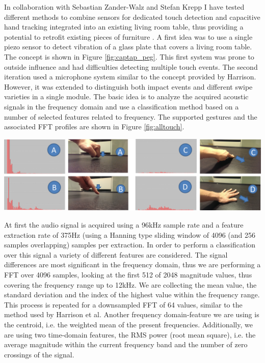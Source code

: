 In collaboration with Sebastian Zander-Walz and Stefan Krepp I have tested different methods to combine sensors for dedicated touch detection and capacitive hand tracking integrated into an existing living room table, thus providing a potential to retrofit existing pieces of furniture \cite{Braun2013captap}. A first idea was to use a single piezo sensor to detect vibration of a glass plate that covers a living room table. The concept is shown in Figure \ref{fig:captap_peg}. This first system was prone to outside influence and had difficulties detecting multiple touch events. The second iteration used a microphone system similar to the concept provided by Harrison. However, it was extended to distinguish both impact events and different swipe varieties in a single module. The basic idea is to analyze the acquired acoustic signals in the frequency domain and use a classification method based on a number of selected features related to frequency. The supported gestures and the associated FFT profiles are shown in Figure \ref{fig:alltouch}.

\begin{minipage}{\linewidth}
\centering
\includegraphics[width=1.0\textwidth]{images/alltouch}
\label{fig:alltouch}
\end{minipage}

At first the audio signal is acquired using a 96kHz sample rate and a feature extraction rate of 375Hz (using a  Hanning type sliding window of 4096 (and 256 samples overlapping) samples per extraction. In order to perform a classification over this signal a variety of different features are considered. The signal differences are most significant in the frequency domain, thus we are performing a FFT over 4096 samples, looking at the first 512 of 2048 magnitude values, thus covering the frequency range up to 12kHz. We are collecting the mean value, the standard deviation and the index of the highest value within the frequency range. This process is repeated for a downsampled FFT of 64 values, similar to the method used by Harrison et al. Another frequency domain-feature we are using is the centroid, i.e. the weighted mean of the present frequencies. Additionally, we are using two time-domain features, the RMS power (root mean square), i.e. the average magnitude within the current frequency band and the number of zero crossings of the signal.

